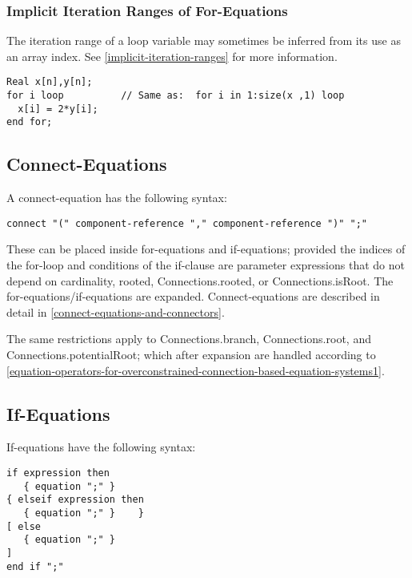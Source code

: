 \subsubsection{Implicit Iteration Ranges of For-Equations}

The iteration range of a loop variable may sometimes be inferred from
its use as an array index. See \autoref{implicit-iteration-ranges} for more information.

\begin{example}
\begin{lstlisting}[language=modelica]
  Real x[n],y[n];
for i loop          // Same as:  for i in 1:size(x ,1) loop
  x[i] = 2*y[i];
end for;
\end{lstlisting}
\end{example}

\subsection{Connect-Equations}

A connect-equation has the following syntax:
\begin{lstlisting}[language=grammar]
connect "(" component-reference "," component-reference ")" ";"
\end{lstlisting}

These can be placed inside for-equations and if-equations; provided the
indices of the for-loop and conditions of the if-clause are parameter
expressions that do not depend on cardinality, rooted,
Connections.rooted, or Connections.isRoot. The
for-equations/if-equations are expanded. Connect-equations are described
in detail in \autoref{connect-equations-and-connectors}.

The same restrictions apply to Connections\allowbreak{}.branch, Connections\allowbreak{}.root, and
Connections\allowbreak{}.potentialRoot; which after expansion are handled according
to \autoref{equation-operators-for-overconstrained-connection-based-equation-systems1}.

\subsection{If-Equations}

If-equations have the following syntax:
\begin{lstlisting}[language=grammar]
if expression then
   { equation ";" }
{ elseif expression then
   { equation ";" }    }
[ else
   { equation ";" }
]
end if ";"
\end{lstlisting}

